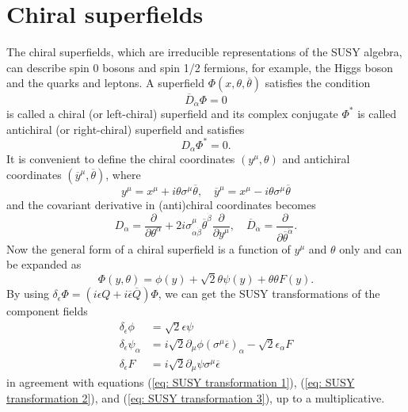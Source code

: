 \documentclass[12pt]{report}
\begin{document}
\section{Chiral superfields}
The chiral superfields, which are irreducible representations of the SUSY algebra, can describe spin 0 bosons and spin 1/2 fermions, for example, the Higgs boson and the quarks and leptons.
A superfield $\Phi (x, \theta, \overline{\theta})$ satisfies the condition
\begin{equation} \label{eq: definition of chiral superfield}
\overline{D}_{\dot{\alpha}} \Phi =0
\end{equation}
 is called a chiral (or left-chiral) superfield and its complex conjugate $\Phi^{*}$ is called antichiral (or right-chiral) superfield and satisfies
 \begin{equation} \label{eq: definition of antichiral superfield}
D_{\alpha} \Phi^{*} = 0.
\end{equation}
It is convenient to define the chiral coordinates $(y^{\mu}, \theta)$ and antichiral coordinates $(\overline{y}^{\mu}, \overline{\theta})$, where
\begin{equation}
y^{\mu} = x^{\mu} + i \theta \sigma^{\mu} \overline{\theta}, \quad 
\overline{y}^{\mu} = x^{\mu} - i \theta \sigma^{\mu} \overline{\theta}
\end{equation}
and the covariant derivative in (anti)chiral coordinates becomes
\begin{equation}
D_{\alpha} = \frac{\partial}{\partial \theta^{\alpha}} + 2 i \sigma^{\mu}_{\alpha \dot{\beta}} \overline{\theta}^{\dot{\beta}} \frac{\partial}{\partial y^{\mu}}, \quad 
\overline{D}_{\dot{\alpha}} = \frac{\partial}{\partial \overline{\theta}^{\dot{\alpha}}} .
\end{equation}
Now the general form of a chiral superfield is a function of $y^{\mu}$ and $\theta$ only and can be expanded as
\begin{equation}
\Phi (y, \theta) = \phi (y) + \sqrt{2} \theta \psi (y) + \theta \theta F(y) .
\end{equation}
By using $\delta_{\epsilon} \Phi = (i \epsilon Q + i \overline{\epsilon} \overline{Q}) \Phi$, we can get the SUSY transformations of the component fields
\begin{align} 
\delta_{\epsilon} \phi &= \sqrt{2} \epsilon \psi \label{eq: SUSY transformation 4}\\
\delta_{\epsilon} \psi_{\alpha} &= i \sqrt{2}  \partial_{\mu} \phi (\sigma^{\mu} \overline{\epsilon})_{\alpha} - \sqrt{2} \epsilon_{\alpha} F \label{eq: SUSY transformation 5}\\
\delta_{\epsilon} F &= i \sqrt{2}  \partial_{\mu} \psi \sigma^{\mu} \overline{\epsilon} \label{eq: SUSY transformation 6}
\end{align}
in agreement with equations (\ref{eq: SUSY transformation 1}), (\ref{eq: SUSY transformation 2}), and (\ref{eq: SUSY transformation 3}), up to a multiplicative.
\end{document}
